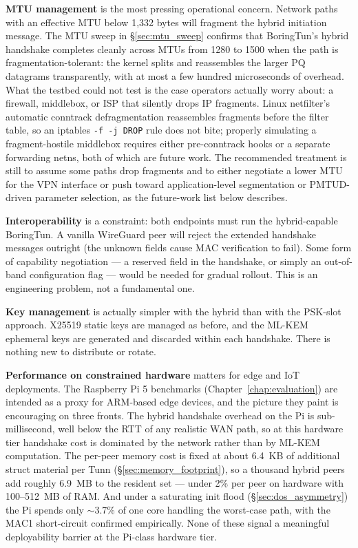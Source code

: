 \textbf{MTU management} is the most pressing operational concern. Network paths with an effective MTU below 1{,}332 bytes will fragment the hybrid initiation message. The MTU sweep in \S\ref{sec:mtu_sweep} confirms that BoringTun's hybrid handshake completes cleanly across MTUs from 1280 to 1500 when the path is fragmentation-tolerant: the kernel splits and reassembles the larger PQ datagrams transparently, with at most a few hundred microseconds of overhead. What the testbed could not test is the case operators actually worry about: a firewall, middlebox, or ISP that silently drops IP fragments. Linux netfilter's automatic conntrack defragmentation reassembles fragments before the filter table, so an iptables \texttt{-f -j DROP} rule does not bite; properly simulating a fragment-hostile middlebox requires either pre-conntrack hooks or a separate forwarding netns, both of which are future work. The recommended treatment is still to assume some paths drop fragments and to either negotiate a lower MTU for the VPN interface or push toward application-level segmentation or PMTUD-driven parameter selection, as the future-work list below describes.

\textbf{Interoperability} is a constraint: both endpoints must run the hybrid-capable BoringTun. A vanilla WireGuard peer will reject the extended handshake messages outright (the unknown fields cause MAC verification to fail). Some form of capability negotiation --- a reserved field in the handshake, or simply an out-of-band configuration flag --- would be needed for gradual rollout. This is an engineering problem, not a fundamental one.

\textbf{Key management} is actually simpler with the hybrid than with the PSK-slot approach. X25519 static keys are managed as before, and the ML-KEM ephemeral keys are generated and discarded within each handshake. There is nothing new to distribute or rotate.

\textbf{Performance on constrained hardware} matters for edge and IoT deployments. The Raspberry Pi 5 benchmarks (Chapter~\ref{chap:evaluation}) are intended as a proxy for ARM-based edge devices, and the picture they paint is encouraging on three fronts. The hybrid handshake overhead on the Pi is sub-millisecond, well below the RTT of any realistic WAN path, so at this hardware tier handshake cost is dominated by the network rather than by ML-KEM computation. The per-peer memory cost is fixed at about 6.4~KB of additional struct material per Tunn (\S\ref{sec:memory_footprint}), so a thousand hybrid peers add roughly 6.9~MB to the resident set --- under 2\% per peer on hardware with 100--512~MB of RAM. And under a saturating init flood (\S\ref{sec:dos_asymmetry}) the Pi spends only $\sim$3.7\% of one core handling the worst-case path, with the MAC1 short-circuit confirmed empirically. None of these signal a meaningful deployability barrier at the Pi-class hardware tier.

